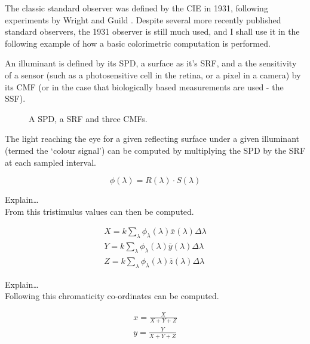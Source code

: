 The classic standard observer was defined by the CIE in 1931, following experiments by Wright and Guild \cite{wright_re-determination_1929, guild_colorimetric_1931}. Despite several more recently published standard observers, the 1931 observer is still much used, and I shall use it in the following example of how a basic colorimetric computation is performed.

An illuminant is defined by its \gls{SPD}, a surface as it's \gls{SRF}, and a the sensitivity of a sensor (such as a photosensitive cell in the retina, or a pixel in a camera) by its \gls{CMF} (or in the case that biologically based measurements are used - the \gls{SSF}).

\begin{figure}[htbp]
\caption{A \gls{SPD}, a \gls{SRF} and three \glspl{CMF}.}
\label{fig:specFun}
\end{figure}

The light reaching the eye for a given reflecting surface under a given illuminant (termed the `colour signal') can be computed by multiplying the \gls{SPD} by the \gls{SRF} at each sampled interval.

\begin{equation}
\phi(\lambda)=R(\lambda) \cdot S(\lambda)
\end{equation}

Explain\dots \\
From this tristimulus values can then be computed.

\begin{subequations}
\begin{align}
X=k \sum_{\lambda} \phi_{\lambda}(\lambda) \overline{x}(\lambda) \Delta \lambda \\ 
Y=k \sum_{\lambda} \phi_{\lambda}(\lambda) \overline{y}(\lambda) \Delta \lambda \\ 
Z=k \sum_{\lambda} \phi_{\lambda}(\lambda) \overline{z}(\lambda) \Delta \lambda
\end{align}
\end{subequations}

Explain\dots \\
Following this chromaticity co-ordinates can be computed.

\begin{subequations}
\begin{align}
x=\frac{X}{X+Y+Z} \\
y=\frac{Y}{X+Y+Z} 
\end{align}
\end{subequations}

